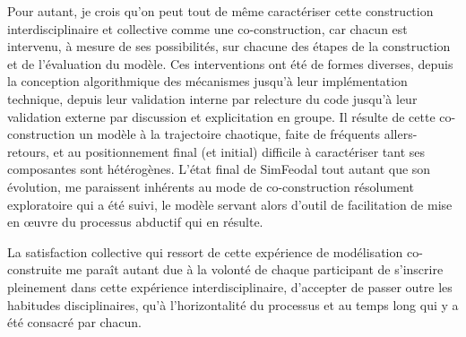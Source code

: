 Pour autant, je crois qu'on peut tout de même caractériser cette construction interdisciplinaire et collective comme une co-construction, car chacun est intervenu, à mesure de ses possibilités, sur chacune des étapes de la construction et de l'évaluation du modèle.
Ces interventions ont été de formes diverses, depuis la conception algorithmique des mécanismes jusqu'à leur implémentation technique, depuis leur validation interne par relecture du code jusqu'à leur validation externe par discussion et explicitation en groupe.
Il résulte de cette co-construction un modèle à la trajectoire chaotique, faite de fréquents allers-retours, et au positionnement final (et initial) difficile à caractériser tant ses composantes sont hétérogènes.
L'état \og final\fg{} de SimFeodal tout autant que son évolution, me paraissent inhérents au mode de co-construction résolument exploratoire qui a été suivi, le modèle servant alors d'outil de facilitation de mise en œuvre du processus abductif qui en résulte.

La satisfaction collective qui ressort de cette expérience de modélisation co-construite me paraît autant due à la volonté de chaque participant de s'inscrire pleinement dans cette expérience interdisciplinaire, d'accepter de passer outre les habitudes disciplinaires, qu'à l'horizontalité du processus et au temps long qui y a été consacré par chacun.

%

%

